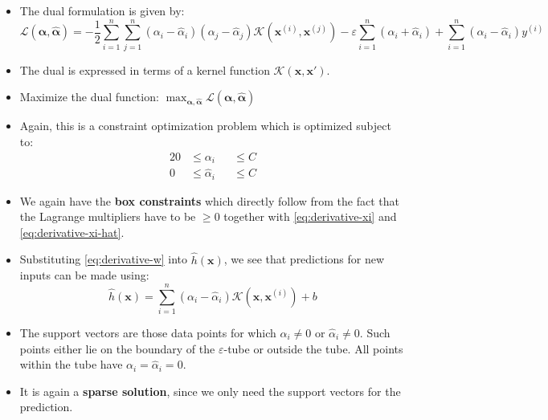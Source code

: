 \begin{frame}
	\begin{itemize}
		\item The dual formulation is given by:
		\begin{equation}
			\mathcal{L}(\bm{\alpha}, \bm{\widehat{\alpha}}) = -\frac{1}{2} \sum_{i=1}^n \sum_{j=1}^n (\alpha_i - \widehat{\alpha}_i) (\alpha_j - \widehat{\alpha}_j)
				\mathcal{K}(\bm{x}^{(i)}, \bm{x}^{(j)}) - \varepsilon \sum_{i=1}^n (\alpha_i + \widehat{\alpha}_i) + \sum_{i=1}^n (\alpha_i - \widehat{\alpha}_i) y^{(i)}
		\end{equation}
		\item The dual is expressed in terms of a kernel function $\mathcal{K}(\bm{x}, \bm{x}')$.
		\item Maximize the dual function: $\max_{\bm{\alpha}, \bm{\widehat{\alpha}}} \mathcal{L}(\bm{\alpha}, \bm{\widehat{\alpha}})$
		\item Again, this is a constraint optimization problem which is optimized subject to:
		\begin{alignat}{2}
			0 	&\le \alpha_i 			&&\le C \\
			0 	&\le \widehat{\alpha}_i 	&&\le C
		\end{alignat}
		\item We again have the \textbf{box constraints} which directly follow from the fact that the Lagrange multipliers have to be $\ge 0$
			together with \cref{eq:derivative-xi} and \cref{eq:derivative-xi-hat}.
	\end{itemize}
\end{frame}


\begin{frame}
	\begin{itemize}
		\item Substituting \cref{eq:derivative-w} into $\widehat{h}(\bm{x})$, we see that predictions for new inputs can be made using:
		\begin{equation}
			\widehat{h}(\bm{x}) = \sum_{i=1}^n (\alpha_i - \widehat{\alpha}_i) \mathcal{K}(\bm{x}, \bm{x}^{(i)}) + b
			\label{eq:svr-prediction}
		\end{equation}
		\item The support vectors are those data points for which $\alpha_i \ne 0$ or $\widehat{\alpha}_i \ne 0$. Such points either lie on the boundary of the
			$\varepsilon$-tube or outside the tube. All points within the tube have $\alpha_i = \widehat{\alpha}_i = 0$.
		\item It is again a \textbf{sparse solution}, since we only need the support vectors for the prediction.
	\end{itemize}
\end{frame}


